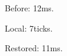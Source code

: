 \documentclass{beamer}
\newcommand{\unit}{ms}
\begin{document}
\begin{frame}
Before: 12\unit.\par
{\renewcommand{\unit}{ticks}Local: 7\unit.\par}
Restored: 11\unit.
\end{frame}
\end{document}
